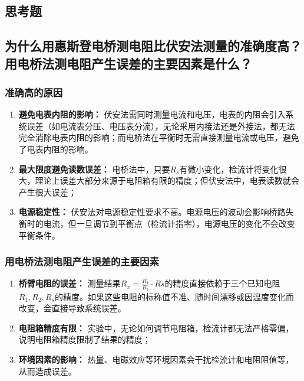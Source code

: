 \documentclass[]{../../templates/Report}%
\begin{document}
\begin{fullreportonly}
    \section{思考题}
    \subsection{为什么用惠斯登电桥测电阻比伏安法测量的准确度高？用电桥法测电阻产生误差的主要因素是什么？}

    \subsubsection{准确高的原因}
    \begin{enumerate}
        \item \textbf{避免电表内阻的影响：} 伏安法需同时测量电流和电压，电表的内阻会引入系统误差（如电流表分压、电压表分流），无论采用内接法还是外接法，都无法完全消除电表内阻的影响；而电桥法在平衡时无需直接测量电流或电压，避免了电表内阻的影响。

        \item \textbf{最大限度避免读数误差：} 电桥法中，只要$R_s$有微小变化，检流计将变化很大，理论上误差大部分来源于电阻箱有限的精度；但伏安法中，电表读数就会产生很大误差；

        \item \textbf{电源稳定性：} 伏安法对电源稳定性要求不高。电源电压的波动会影响桥路失衡时的电流，但一旦调节到平衡点（检流计指零），电源电压的变化不会改变平衡条件。
    \end{enumerate}
    \subsubsection{用电桥法测电阻产生误差的主要因素}
    \begin{enumerate}
        \item \textbf{桥臂电阻的误差：} 测量结果$ R_x = \frac{R_1}{R_2} \cdot Rs $的精度直接依赖于三个已知电阻$R_1, R_2, R_s$的精度。如果这些电阻的标称值不准、随时间漂移或因温度变化而改变，会直接导致系统误差。
        \item \textbf{电阻箱精度有限：} 实验中，无论如何调节电阻箱，检流计都无法严格零偏，说明电阻箱精度限制了结果的精度；
        \item \textbf{环境因素的影响：} 热量、电磁效应等环境因素会干扰检流计和电阻阻值等，从而造成误差。
    \end{enumerate}

\end{fullreportonly}
\end{document}
